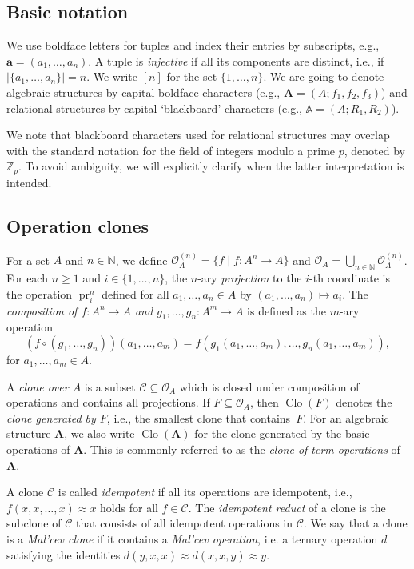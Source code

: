 \documentclass[12pt]{amsart}
\theoremstyle{definition}
\theoremstyle{definition}
\newcommand{\struct}[1]{\mathbb{#1}}
\newcommand{\clo}[1]{\mathcal{#1}}
\newcommand{\alg}[1]{\mathbf{#1}}
\newcommand{\algA}{\alg{A}}
\DeclareMathOperator{\pr}{pr}
\DeclareMathOperator{\Clo}{Clo}
\begin{document}
\subsection*{Basic notation} We use boldface letters for tuples and index their entries by subscripts, e.g., $\boldsymbol{a}=(a_1,\dots,a_n)$. A tuple is \emph{injective} if all its components are distinct, i.e., if $|\{a_1,\dots,a_n\}|=n$.  We write $[n]$ for the set $\{1,\dots,n\}$. We are going to denote algebraic structures by capital boldface characters (e.g., $\alg{A} = (A;f_1,f_2,f_3)$) and relational structures by capital `blackboard' characters (e.g., $\struct{A} = (A;R_1,R_2)$).

We note that blackboard characters used for relational structures may overlap with the standard notation for the field of integers modulo a prime $p$, denoted by $\mathbb Z_p$. To avoid ambiguity, we will explicitly clarify when the latter interpretation is intended.

\subsection{Operation clones}\label{sec:operationClones}
For a set $A$ and $n \in {\mathbb N}$, we define ${\mathcal O}^{(n)}_A = \{f\mid f\colon A^n\to A\}$ and ${\mathcal O}_A = \bigcup_{n \in {\mathbb N}} {\mathcal O}^{(n)}_A$. For each $n\geq 1$ and $i\in\{1,\dots,n\}$, the $n$-ary \emph{projection} to the $i$-th coordinate is the
operation $\pr^{n}_{i}$ defined for all $a_1,\dots,a_n\in A$ by $(a_1,\dots,a_n)\mapsto a_i$. 
The \emph{composition of $f \colon A^n \to A$ and $g_1,\dots, g_n \colon A^m \to A$} is defined as the $m$-ary operation
\[
(f \circ (g_1,\dots, g_n))(a_1,\dots, a_m) = f(g_1(a_1,\dots, a_m),\dots, g_n(a_1,\dots, a_m)),\]
\noindent for $a_1,\dots, a_m\in A$.

A \emph{clone over $A$} is a subset $\clo{C}\subseteq\mathcal O_A$ which is closed under composition of operations and contains all projections. If $F \subseteq {\mathcal O}_A$, then $\Clo(F)$ denotes the \emph{clone generated by $F$}, i.e., the smallest clone that contains~$F$. For an algebraic structure $\algA$, we also write $\Clo(\algA)$ for the clone generated by the basic operations of $\algA$. This is commonly referred to as the \emph{clone of term operations} of $\algA$.

A clone $\mathcal C$ is called \emph{idempotent} if all its operations are idempotent, i.e., $f(x,x,\ldots,x) \approx x$ holds for all $f\in \mathcal C$. The \emph{idempotent reduct} of a clone is the subclone of $\mathcal C$ that consists of all idempotent operations in $\mathcal C$.
We say that a clone is a \emph{Mal'cev clone} if it contains a \emph{Mal'cev operation}, i.e. a ternary operation $d$ satisfying the identities $d(y,x,x) \approx d(x,x,y) \approx y$.
\end{document}

